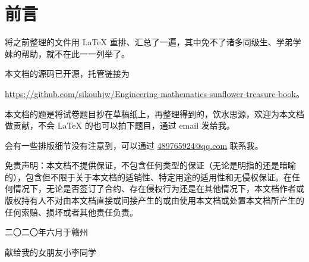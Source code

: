 \chapter{前言}
将之前整理的文件用 \LaTeX{} 重排、汇总了一遍，其中免不了诸多同级生、学弟学妹的帮助，就不在此一一列举了。

本文档的源码已开源，托管链接为
\begin{center}
	\url{https://github.com/sikouhjw/Engineering-mathematics-sunflower-treasure-book}。
\end{center}

本文档的题是将试卷题目抄在草稿纸上，再整理得到的，饮水思源，欢迎为本文档做贡献，不会 \LaTeX{} 的也可以拍下题目，通过 email 发给我。

会有一些排版细节没有注意到，可以通过 \href{mailto:489765924@qq.com}{489765924@qq.com} 联系我。

免责声明：本文档不提供保证，不包含任何类型的保证（无论是明指的还是暗喻的），包含但不限于关于本文档的适销性、特定用途的适用性和无侵权保证。在任何情况下，无论是否签订了合约、存在侵权行为还是在其他情况下，本文档作者或版权持有人不对由本文档直接或间接产生的或由使用本文档或处置本文档所产生的任何索赔、损坏或者其他责任负责。
\begin{flushright}
	二〇二〇年六月于赣州
\end{flushright}
\newpage
\thispagestyle{empty}
\vspace*{\fill}
\begin{center}
	\LARGE 献给我的女朋友小李同学
\end{center}
\vspace*{\fill}